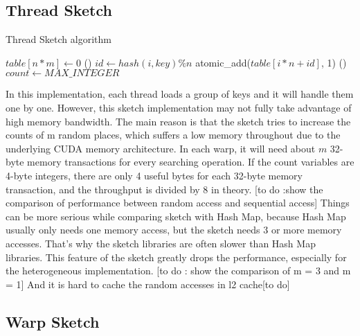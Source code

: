 \documentclass[conference]{IEEEtran}
\begin{document}
\subsection{Thread Sketch}
\begin{algorithm}
    \DontPrintSemicolon
    \caption{Thread Sketch algorithm}
    $table[n * m] \longleftarrow 0$\;
\Fn(){}
{
    {
        {
            $id \leftarrow hash(i, key) \% n$\;
            atomic\_add($table[i * n + id]$, 1)\;
        }
    }
}
\Fn(){}
{
    {
        $count \leftarrow MAX\_INTEGER$\;
    }
}

\end{algorithm}

In this implementation, each thread loads a group of keys and it will handle them one by one. However, this sketch implementation may not fully take advantage of high memory bandwidth. The main reason is that the sketch tries to increase the counts of m random places, which suffers a low memory throughout due to the underlying CUDA memory architecture. In each warp, it will need about $m$ 32-byte memory transactions for every searching operation. If the count variables are 4-byte integers, there are only 4 useful bytes for each 32-byte memory transaction, and the throughput is divided by 8 in theory. 
[to do :show the comparison of performance between random access and sequential access]
Things can be more serious while comparing sketch with Hash Map, because Hash Map usually only needs one memory access, but the sketch needs 3 or more memory accesses. That's why the sketch libraries are often slower than Hash Map libraries. This feature of the sketch greatly drops the performance, especially for the heterogeneous implementation. [to do : show the comparison of m = 3 and m = 1]
And it is hard to cache the random accesses in l2 cache[to do]
\subsection{Warp Sketch}
\end{document}

